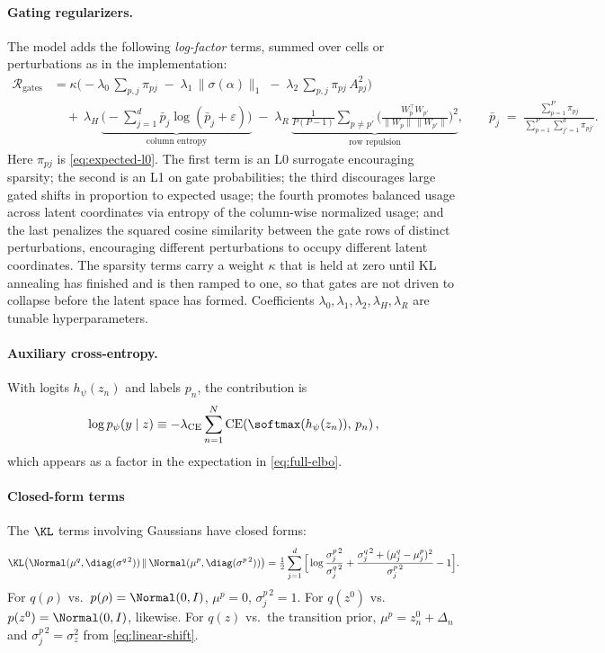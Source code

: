 \paragraph{Gating regularizers.}
The model adds the following \emph{log-factor} terms, summed over cells or perturbations as in the
implementation:
\begin{align}
  \mathcal{R}_{\text{gates}}
  &= \kappa\Big(-\lambda_{0}\,\sum_{p,j}\pi_{pj}
   \;-\; \lambda_{1}\,\big\|\sigma(\alpha)\big\|_{1}
   \;-\; \lambda_{2}\,\sum_{p,j} \pi_{pj}\,A_{pj}^2\Big)
\\&\quad
   +\ \lambda_{H}\,\underbrace{\Big(-\textstyle\sum_{j=1}^d \bar{p}_j \log(\bar{p}_j+\varepsilon)\Big)}_{\text{column entropy}}
   \;-\; \lambda_{R}\,\underbrace{\frac{1}{P(P-1)}\sum_{p \neq p'} \Big(\tfrac{W_p^\top W_{p'}}{\|W_p\|\,\|W_{p'}\|}\Big)^{2}}_{\text{row repulsion}},
  \qquad
  \bar{p}_j \;=\; \frac{\sum_{p=1}^P \pi_{pj}}{\sum_{p=1}^P\sum_{j'=1}^d \pi_{pj'}}.
\end{align}
Here $\pi_{pj}$ is \eqref{eq:expected-l0}. The first term is an L0 surrogate encouraging sparsity; the
second is an L1 on gate probabilities; the third discourages large gated shifts in proportion to
expected usage; the fourth promotes balanced usage across latent coordinates via entropy of the
column-wise normalized usage; and the last penalizes the squared cosine similarity between the gate
rows of distinct perturbations, encouraging different perturbations to occupy different latent
coordinates. The sparsity terms carry a weight $\kappa$ that is held at zero until KL annealing has
finished and is then ramped to one, so that gates are not driven to collapse before the latent space
has formed. Coefficients $\lambda_0,\lambda_1,\lambda_2,\lambda_H,\lambda_R$ are tunable
hyperparameters.

\paragraph{Auxiliary cross-entropy.}
With logits $h_\psi(z_n)$ and labels $p_n$, the contribution is
\[
\log p_\psi(y\mid z) \equiv -\lambda_{\mathrm{CE}}\sum_{n=1}^N \mathrm{CE}\!\left(\softmax(h_\psi(z_n)),\,p_n\right),
\]
which appears as a factor in the expectation in \eqref{eq:full-elbo}.

\paragraph{Closed-form terms}
The $\KL$ terms involving Gaussians have closed forms:
\begin{align}
\KL\big(\Normal(\mu^q,\diag(\sigma^{q\,2}))\,\|\,\Normal(\mu^p,\diag(\sigma^{p\,2}))\big)
=\tfrac12\sum_{j=1}^d \Big[
\log \frac{\sigma^{p\,2}_j}{\sigma^{q\,2}_j}
+\frac{\sigma^{q\,2}_j + (\mu^q_j-\mu^p_j)^2}{\sigma^{p\,2}_j}-1\Big].
\end{align}
For $q(\rho)$ vs.\ $p(\rho)=\Normal(0,I)$, $\mu^p=0$, $\sigma^{p\,2}_j=1$.
For $q(z^0)$ vs.\ $p(z^0)=\Normal(0,I)$, likewise.
For $q(z)$ vs.\ the transition prior, $\mu^p = z^0_n + \Delta_n$ and
$\sigma^{p\,2}_j = \sigma_z^2$ from \eqref{eq:linear-shift}.

